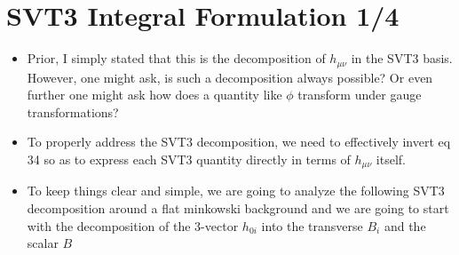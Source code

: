 \documentclass[10pt,letterpaper]{article}
\numberwithin{equation}{section}
\begin{document}

\section{SVT3 Integral Formulation 1/4}
\begin{itemize}
	\item Prior, I simply stated that this is the decomposition of $h_{\mu\nu}$ in the SVT3 basis. However, one might ask, is such a decomposition always possible? Or even further one might ask how does a quantity like $\phi$ transform under gauge transformations?
	\item To properly address the SVT3 decomposition, we need to effectively invert eq 34 so as to express each SVT3 quantity directly in terms of $h_{\mu\nu}$ itself.
	\item To keep things clear and simple, we are going to analyze the following SVT3 decomposition around a flat minkowski background and we are going to start with the decomposition of the 3-vector $h_{0i}$ into the transverse $B_i$ and the scalar $B$
\end{itemize}

\end{document}
